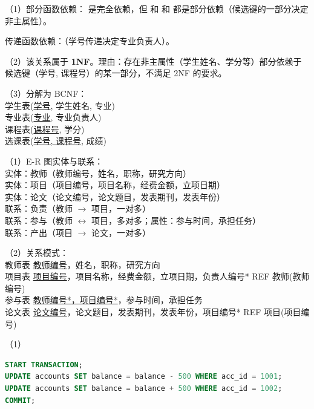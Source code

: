 \documentclass[a4paper,11pt]{article}
\begin{document}
\q （1）部分函数依赖： 是完全依赖，但  和  和  都是部分依赖（候选键的一部分决定非主属性）。

传递函数依赖：（学号传递决定专业负责人）。

\par（2）该关系属于 \textbf{1NF}。理由：存在非主属性（学生姓名、学分等）部分依赖于候选键（学号, 课程号）的某一部分，不满足 2NF 的要求。

\par（3）分解为 BCNF：\\
学生表(\underline{学号}, 学生姓名, 专业)\\
专业表(\underline{专业}, 专业负责人)\\
课程表(\underline{课程号}, 学分)\\
选课表(\underline{学号, 课程号}, 成绩)


\q （1）E-R 图实体与联系：\\
实体：教师（教师编号，姓名，职称，研究方向）\\
实体：项目（项目编号，项目名称，经费金额，立项日期）\\
实体：论文（论文编号，论文题目，发表期刊，发表年份）\\
联系：负责（教师 $\to$ 项目，一对多）\\
联系：参与（教师 $\leftrightarrow$ 项目，多对多；属性：参与时间，承担任务）\\
联系：产出（项目 $\to$ 论文，一对多）

\par（2）关系模式：\\
教师表 \underline{教师编号}，姓名，职称，研究方向\\
项目表 \underline{项目编号}，项目名称，经费金额，立项日期，负责人编号* REF 教师(教师编号)\\
参与表 \underline{教师编号*，项目编号*}，参与时间，承担任务\\
论文表 \underline{论文编号}，论文题目，发表期刊，发表年份，项目编号* REF 项目(项目编号)


\q
\par （1）
\begin{lstlisting}[language=SQL]
START TRANSACTION;
UPDATE accounts SET balance = balance - 500 WHERE acc_id = 1001;
UPDATE accounts SET balance = balance + 500 WHERE acc_id = 1002;
COMMIT;
\end{lstlisting}
\end{document}
